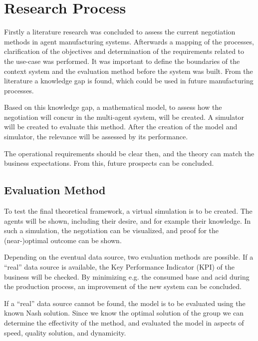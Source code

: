 \section{Research Process}
Firstly a literature research was concluded to assess the current negotiation methods in agent manufacturing systems. Afterwards a mapping of the processes, clarification of the objectives and determination of the requirements related to the use-case was performed. It was important to define the boundaries of the context system and the evaluation method before the system was built. From the literature a knowledge gap is found, which could be used in future manufacturing processes.

Based on this knowledge gap, a mathematical model, to assess how the negotiation will concur in the multi-agent system, will be created. A simulator will be created to evaluate this method. After the creation of the model and simulator, the relevance will be assessed by its performance.


The operational requirements should be clear then, and the theory can match the business expectations. From this, future prospects can be concluded.


\subsection{Evaluation Method}
To test the final theoretical framework, a virtual simulation is to be created. The agents will be shown, including their desire, and for example their knowledge. In such a simulation, the negotiation can be visualized, and proof for the (near-)optimal outcome can be shown. 

Depending on the eventual data source, two evaluation methods are possible. If a ``real'' data source is available, the Key Performance Indicator (KPI) of the business will be checked. By minimizing e.g. the consumed base and acid during the production process, an improvement of the new system can be concluded.

If a ``real'' data source cannot be found, the model is to be evaluated using the known Nash solution. Since we know the optimal solution of the group we can determine the effectivity of the method, and evaluated the model in aspects of speed, quality solution, and dynamicity.

